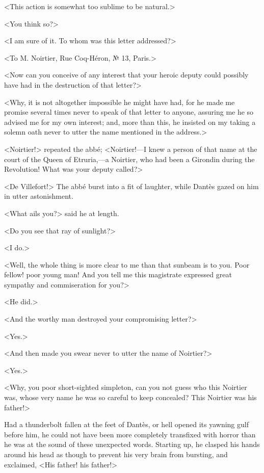  <This action is somewhat too sublime to be natural.> 

 <You think so?> 

 <I am sure of it. To whom was this letter addressed?> 

 <To M. Noirtier, Rue Coq-Héron, № 13, Paris.> 

 <Now can you conceive of any interest that your heroic deputy could possibly have had in the destruction of that letter?> 

 <Why, it is not altogether impossible he might have had, for he made me promise several times never to speak of that letter to anyone, assuring me he so advised me for my own interest; and, more than this, he insisted on my taking a solemn oath never to utter the name mentioned in the address.> 

 <Noirtier!> repeated the abbé; <Noirtier!—I knew a person of that name at the court of the Queen of Etruria,—a Noirtier, who had been a Girondin during the Revolution! What was your deputy called?> 

 <De Villefort!> The abbé burst into a fit of laughter, while Dantès gazed on him in utter astonishment. 

 <What ails you?> said he at length. 

 <Do you see that ray of sunlight?> 

 <I do.> 

 <Well, the whole thing is more clear to me than that sunbeam is to you. Poor fellow! poor young man! And you tell me this magistrate expressed great sympathy and commiseration for you?> 

 <He did.> 

 <And the worthy man destroyed your compromising letter?> 

 <Yes.> 

 <And then made you swear never to utter the name of Noirtier?> 

 <Yes.> 

 <Why, you poor short-sighted simpleton, can you not guess who this Noirtier was, whose very name he was so careful to keep concealed? This Noirtier was his father!> 

 Had a thunderbolt fallen at the feet of Dantès, or hell opened its yawning gulf before him, he could not have been more completely transfixed with horror than he was at the sound of these unexpected words. Starting up, he clasped his hands around his head as though to prevent his very brain from bursting, and exclaimed, <His father! his father!> 

